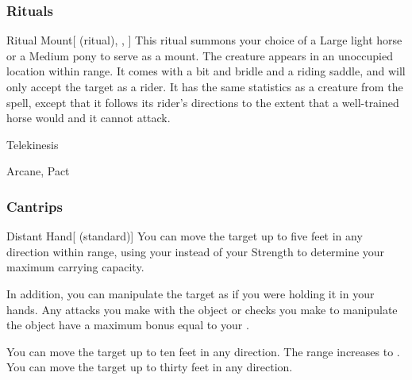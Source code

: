 \subsubsection{Rituals}


\lowercase{\hypertarget{spell:Ritual Mount}{}}\label{spell:Ritual Mount}
\begin{attuneability}[Rank 3]{\hypertarget{spell:Ritual Mount}{Ritual Mount}}[ (ritual), , ]
This ritual summons your choice of a Large light horse or a Medium pony to serve as a mount.
The creature appears in an unoccupied location within \rngmed range.
It comes with a bit and bridle and a riding saddle, and will only accept the target as a rider.
It has the same statistics as a creature from the  spell, except that it follows its rider's directions to the extent that a well-trained horse would and it cannot attack.
\end{attuneability}
\vspace{0.25em}


\newpage
\begin{spellsection}{Telekinesis}

\begin{spellheader}
\end{spellheader}


 Arcane, Pact

\subsubsection{Cantrips}


\begin{freeability}{Distant Hand}[ (standard)]
You can move the target up to five feet in any direction within range, using your  instead of your Strength to determine your maximum carrying capacity.

In addition, you can manipulate the target as if you were holding it in your hands.
Any attacks you make with the object or checks you make to manipulate the object have a maximum bonus equal to your .

\rankline
{} You can move the target up to ten feet in any direction.
 The range increases to \rngmed.
 You can move the target up to thirty feet in any direction.
\end{freeability}

\end{spellsection}


